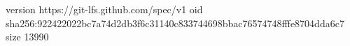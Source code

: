 version https://git-lfs.github.com/spec/v1
oid sha256:922422022bc7a74d2db3f6c31140c833744698bbac76574748fffe8704dda6c7
size 13990
